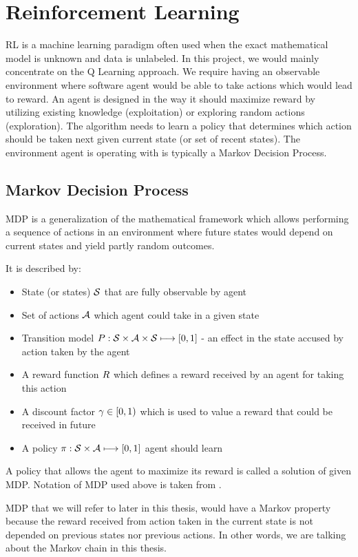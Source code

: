 \section{Reinforcement Learning}

RL is a machine learning paradigm often used when the exact mathematical model is unknown and data is unlabeled. In this project, we would mainly concentrate on the Q Learning approach. We require having an observable environment where software agent would be able to take actions which would lead to reward. An agent is designed in the way it should maximize reward by utilizing existing knowledge (exploitation) or exploring random actions (exploration). The algorithm needs to learn a policy that determines which action should be taken next given current state (or set of recent states). The environment agent is operating with is typically a Markov Decision Process.

\subsection{Markov Decision Process}

MDP is a generalization of the mathematical framework which allows performing a sequence of actions in an environment where future states would depend on current states and yield partly random outcomes.

It is described by:
\begin{itemize}
  \item State (or states) $\mathcal{S}$ that are fully observable by agent
  \item Set of actions $\mathcal{A}$ which agent could take in a given state
  \item Transition model $P:\mathcal{S} \times \mathcal{A} \times \mathcal{S} \longmapsto [0,1]$ - an effect in the state accused by action taken by the agent
  \item A reward function $R$ which defines a reward received by an agent for taking this action
  \item A discount factor $\gamma \in [0, 1)$ which is used to value a reward that could be received in future
  \item A policy $\pi : \mathcal{S} \times \mathcal{A} \longmapsto [0, 1]$ agent should learn
\end{itemize}

A policy that allows the agent to maximize its reward is called a solution of given MDP. Notation of MDP used above is taken from \cite{Thomas15a}.

MDP that we will refer to later in this thesis, would have a Markov property because the reward received from action taken in the current state is not depended on previous states nor previous actions. In other words, we are talking about the Markov chain in this thesis.

